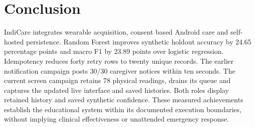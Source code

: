 \section{Conclusion}
\begin{reportprose}
IndiCare integrates wearable acquisition, consent based Android care and self-hosted persistence. Random Forest improves synthetic holdout accuracy by 24.65 percentage points and macro F1 by 23.89 points over logistic regression. Idempotency reduces forty retry rows to twenty unique records. The earlier notification campaign posts 30/30 caregiver notices within ten seconds. The current screen campaign retains 78 physical readings, drains its queue and captures the updated live interface and saved histories. Both roles display retained history and saved synthetic confidence. These measured achievements establish the educational system within its documented execution boundaries, without implying clinical effectiveness or unattended emergency response.
\end{reportprose}
